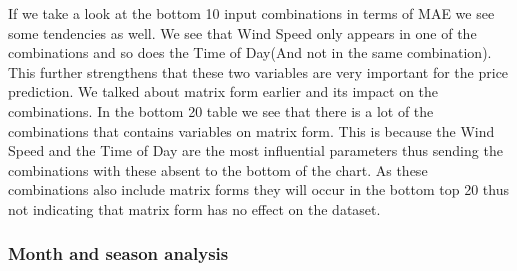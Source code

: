 If we take a look at the bottom 10 input combinations in terms of MAE we see some tendencies as well. We see that Wind Speed only appears in one of the combinations and so does the Time of Day(And not in the same combination). This further strengthens that these two variables are very important for the price prediction. We talked about matrix form earlier and its impact on the combinations. In the bottom 20 table we see that there is a lot of the combinations that contains variables on matrix form. This is because the Wind Speed and the Time of Day are the most influential parameters thus sending the combinations with these absent to the bottom of the chart. As these combinations also include matrix forms they will occur in the bottom top 20 thus not indicating that matrix form has no effect on the dataset.

\subsubsection{Month and season analysis}
\begin{table}[H]
\centering  %
\caption{Top20(3 months) compared to 4 months run.} %
\label{table:top20comparedTo4months} %
\end{table}

